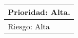 \begin{longtable}{|l|l|}
\multicolumn{2}{|l|}{Prioridad: Alta.}                                                                                                                                                                                                                                                                                                                                                                                                                                                                                                                                                      \\ \hline
\multicolumn{2}{|l|}{Riesgo: Alta}                                                                                                                                                                                                                                                                                                                                                                                                                                                                                                                                                          \\ \hline
\end{longtable}